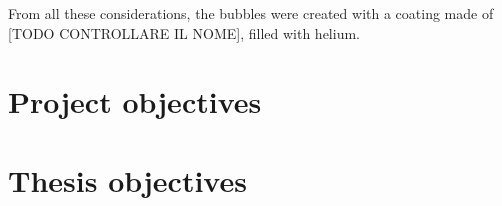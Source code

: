 From all these considerations, the bubbles were created with a coating made of [TODO CONTROLLARE IL NOME], filled with helium.


\section{Project objectives}

\section{Thesis objectives}
